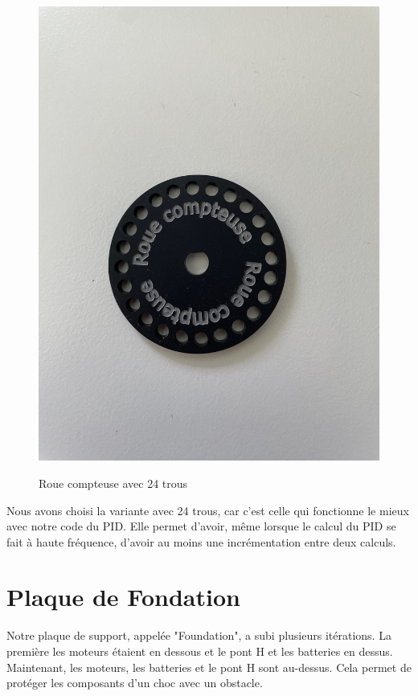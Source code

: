 \documentclass[
	a4paper,									%
	11pt,										%
	twoside,									%
	openright,									%
	notitlepage,									%
	parskip=half,								%
]{scrreprt}										%
\begin{document}
\begin{figure}[!h]
	\centering
	\includegraphics[scale=.08]{img/RoueCompteuse.png}
	\label{RoueCompteuse2}
	\caption{Roue compteuse avec 24 trous}
\end{figure}

Nous avons choisi la variante avec 24 trous, car c'est celle qui fonctionne le mieux avec notre code du PID.
Elle permet d'avoir, même lorsque le calcul du PID se fait à haute fréquence, d'avoir au moins une incrémentation
entre deux calculs. \par

\section{Plaque de Fondation}

Notre plaque de support, appelée "Foundation", a subi plusieurs itérations. La première les moteurs étaient en dessous
et le pont H et les batteries en dessus. Maintenant, les moteurs, les batteries et le pont H sont au-dessus. 
Cela permet de protéger les composants d'un choc avec un obstacle. \par
\end{document}
